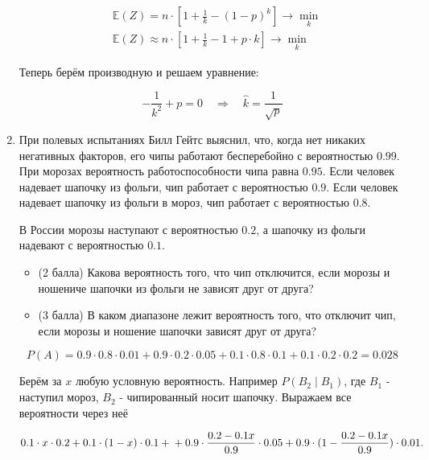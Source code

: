 \documentclass[12pt]{article}
\newenvironment{solution}{}{}
\begin{document}
\begin{enumerate}
\begin{solution}
    \begin{equation*} 
    \begin{aligned}
    &\mathbb{E}(Z) = n \cdot \left[1 + \frac{1}{k} - (1-p)^k \right] \to \min_k \\
    &\mathbb{E}(Z) \approx n \cdot \left[1 + \frac{1}{k} - 1 + p \cdot k \right] \to \min_k
    \end{aligned}
    \end{equation*}
    
    Теперь берём производную и решаем уравнение: 
    
    $$
    - \frac{1}{k^2} + p = 0 \quad \Rightarrow \quad \hat k = \frac{1}{\sqrt{p}}
    $$
\end{solution} 

    \item При полевых испытаниях Билл Гейтс выяснил, что, когда нет никаких негативных факторов, его чипы работают бесперебойно с вероятностью $0.99$. При морозах вероятность работоспособности чипа равна $0.95$. Если человек надевает шапочку из фольги, чип работает с вероятностью $0.9$. Если человек надевает шапочку из фольги в мороз, чип работает с вероятностью $0.8$. 

    В России морозы наступают с вероятностью $0.2$, а шапочку из фольги надевают с вероятностью $0.1$. 

    \begin{itemize}
    \item (2 балла) Какова вероятность того, что чип отключится, если морозы и ношениче шапочки из фольги не зависят друг от друга?
    
    \item (3 балла) В каком диапазоне лежит вероятность того, что отключит чип, если морозы и ношение шапочки зависят друг от друга? 
    \end{itemize} 
    
\begin{solution}
\[P(A) = 0.9 \cdot 0.8 \cdot 0.01 + 0.9 \cdot 0.2 \cdot 0.05 + 0.1 \cdot 0.8 \cdot 0.1 + 0.1 \cdot 0.2 \cdot 0.2 = 0.028\]
    
Берём за $x$ любую условную вероятность. Например $P(B_2 \mid B_1)$, где $B_1$ - наступил мороз, $B_2$ - чипированный носит шапочку. Выражаем все вероятности через неё
    
\[
0.1 \cdot x \cdot 0.2 + 0.1 \cdot (1-x) \cdot 0.1 + \\ + 0.9 \cdot \frac{0.2 - 0.1x}{0.9} \cdot 0.05 + 0.9 \cdot (1 - \frac{0.2 - 0.1x}{0.9}) \cdot 0.01.
\]


\end{solution}
\end{enumerate}
\end{document}
